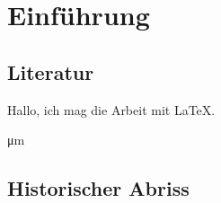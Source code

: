 \chapter{Einführung}\label{cha:einführung}
\section{Literatur}

\cite{kohm:2018} \citeyear{kohm:2018}

\blindtext[1] Hallo, ich mag die Arbeit mit \LaTeX.

\si{\micro\meter}

\blindtext[1]

\blindtext[1]

\blindtext[1]

\blindtext[2]


\section{Historischer Abriss}

\blindtext[5]
